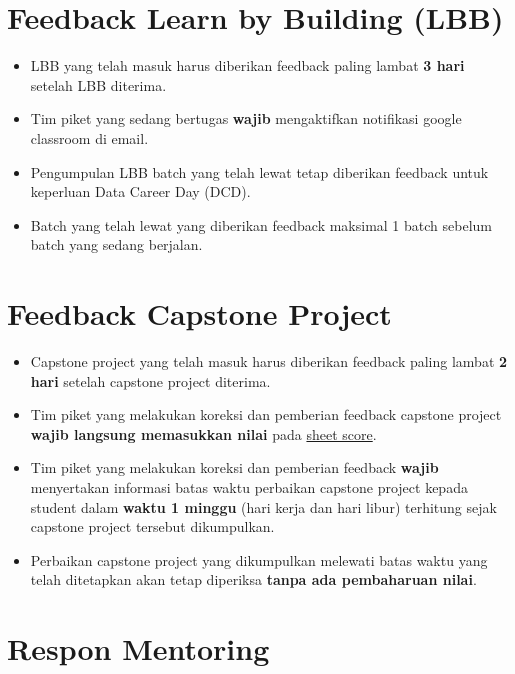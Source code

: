 \documentclass[
]{book}
\providecommand{\tightlist}{%
  \setlength{\itemsep}{0pt}\setlength{\parskip}{0pt}}
\begin{document}
\hypertarget{feedback-learn-by-building-lbb}{%
\section{Feedback Learn by Building (LBB)}\label{feedback-learn-by-building-lbb}}

\begin{itemize}
\tightlist
\item
  LBB yang telah masuk harus diberikan feedback paling lambat \textbf{3 hari} setelah LBB diterima.
\item
  Tim piket yang sedang bertugas \textbf{wajib} mengaktifkan notifikasi google classroom di email.
\item
  Pengumpulan LBB batch yang telah lewat tetap diberikan feedback untuk keperluan Data Career Day (DCD).
\item
  Batch yang telah lewat yang diberikan feedback maksimal 1 batch sebelum batch yang sedang berjalan.
\end{itemize}

\hypertarget{feedback-capstone-project}{%
\section{Feedback Capstone Project}\label{feedback-capstone-project}}

\begin{itemize}
\tightlist
\item
  Capstone project yang telah masuk harus diberikan feedback paling lambat \textbf{2 hari} setelah capstone project diterima.
\item
  Tim piket yang melakukan koreksi dan pemberian feedback capstone project \textbf{wajib langsung memasukkan nilai} pada \href{https://docs.google.com/spreadsheets/d/1cGJ0pn9k9gKCBnceWVwaL9D7BBDMNjLh8uPYlaBlJi8/edit?usp=sharing}{sheet score}.
\item
  Tim piket yang melakukan koreksi dan pemberian feedback \textbf{wajib} menyertakan informasi batas waktu perbaikan capstone project kepada student dalam \textbf{waktu 1 minggu} (hari kerja dan hari libur) terhitung sejak capstone project tersebut dikumpulkan.
\item
  Perbaikan capstone project yang dikumpulkan melewati batas waktu yang telah ditetapkan akan tetap diperiksa \textbf{tanpa ada pembaharuan nilai}.
\end{itemize}

\hypertarget{respon-mentoring}{%
\section{Respon Mentoring}\label{respon-mentoring}}
\end{document}
